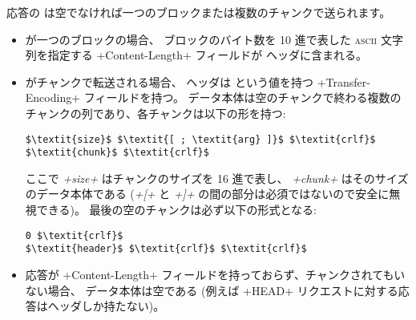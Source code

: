 応答の \textit{} は空でなければ一つのブロックまたは複数のチャンクで送られます。

\begin{itemize}
\item \textit{} が一つのブロックの場合、
  ブロックのバイト数を 10 進で表した \textsc{ascii} 文字列を指定する \ml+Content-Length+ フィールドが
  ヘッダに含まれる。

\item \textit{} がチャンクで転送される場合、
  ヘッダは  という値を持つ \ml+Transfer-Encoding+ フィールドを持つ。
  データ本体は空のチャンクで終わる複数のチャンクの列であり、各チャンクは以下の形を持つ:
%
\begin{lstlisting}
$\textit{size}$ $\textit{[ ; \textit{arg} ]}$ $\textit{crlf}$
$\textit{chunk}$ $\textit{crlf}$
\end{lstlisting}
%
ここで \textit{\ml+size+} はチャンクのサイズを 16 進で表し、
\textit{\ml+chunk+} はそのサイズのデータ本体である (\textit{\ml+[+} と \textit{\ml+]+}
の間の部分は必須ではないので安全に無視できる)。
最後の空のチャンクは必ず以下の形式となる:
%
\begin{lstlisting}
0 $\textit{crlf}$
$\textit{header}$ $\textit{crlf}$ $\textit{crlf}$
\end{lstlisting}
%
\item 応答が \ml+Content-Length+ フィールドを持っておらず、チャンクされてもいない場合、
  データ本体は空である (例えば \ml+HEAD+ リクエストに対する応答はヘッダしか持たない)。
\end{itemize}
